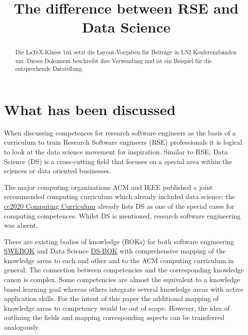\documentclass[
        english,biblatex
    ]{lni}
\begin{document}
        \title[]{The difference between RSE and Data Science}
    
    
    

    \maketitle

        \begin{abstract}
        Die LaTeX-Klasse \texttt{lni} setzt die Layout-Vorgaben für
        Beiträge in LNI Konferenzbänden um. Dieses Dokument beschreibt
        ihre Verwendung und ist ein Beispiel für die entsprechende
        Darstellung.
    \end{abstract}
    
    
    \section{What has been discussed}\label{what-has-been-discussed}

    When discussing competences for research software engineers as the
    basis of a curriculum to train Research Software engineers (RSE)
    professionals it is logical to look at the data science movement for
    inspiration. Similar to RSE, Data Science (DS) is a cross-cutting
    field that focuses on a special area within the sciences or data
    oriented businesses.

    The major computing organizations ACM and IEEE published a joint
    recommended computing curriculum which already included data
    science: the
    \href{https://www.acm.org/binaries/content/assets/education/curricula-recommendations/cc2020.pdf}{cc2020
    Computing Curriculum} already lists DS as one of the special cases
    for computing competences. Whilst DS is mentioned, research software
    engineering was absent.

    There are existing bodies of knowledge (BOKs) for both software
    engineering
    \href{https://www.computer.org/education/bodies-of-knowledge/software-engineering/topics}{SWEBOK}
    and Data Science
    \href{https://edison-project.eu/sites/edison-project.eu/files/filefield_paths/edison_ds-bok-release2-v04.pdf}{DS-BOK}
    with comprehensive mapping of the knowledge areas to each and other
    and to the ACM computing curriculum in general. The connection
    between competencies and the corresponding knowledge canon is
    complex. Some competencies are almost the equivalent to a knowledge
    based learning goal whereas others integrate several knowledge areas
    with active application skills. For the intent of this paper the
    additional mapping of knowledge areas to competency would be out of
    scope. However, the idea of outlining the fields and mapping
    corresponding aspects can be transferred analogously.
\end{document}
